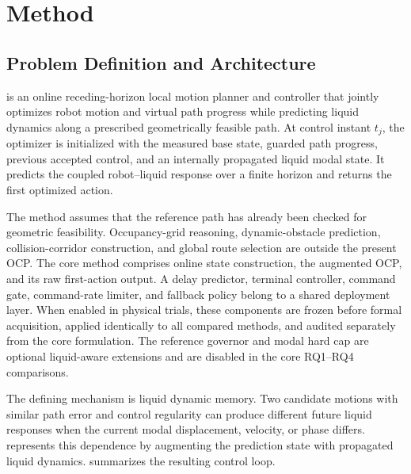 \section{\SMPCC{} Method}
\label{sec:method}

\subsection{Problem Definition and Architecture}

\SMPCC{} is an online receding-horizon local motion planner and controller that jointly optimizes robot motion and virtual path progress while predicting liquid dynamics along a prescribed geometrically feasible path. At control instant $t_j$, the optimizer is initialized with the measured base state, guarded path progress, previous accepted control, and an internally propagated liquid modal state. It predicts the coupled robot--liquid response over a finite horizon and returns the first optimized action.

The method assumes that the reference path has already been checked for geometric feasibility. Occupancy-grid reasoning, dynamic-obstacle prediction, collision-corridor construction, and global route selection are outside the present OCP. The core method comprises online state construction, the augmented OCP, and its raw first-action output. A delay predictor, terminal controller, command gate, command-rate limiter, and fallback policy belong to a shared deployment layer. When enabled in physical trials, these components are frozen before formal acquisition, applied identically to all compared methods, and audited separately from the core formulation. The reference governor and modal hard cap are optional liquid-aware extensions and are disabled in the core RQ1--RQ4 comparisons.

The defining mechanism is liquid dynamic memory. Two candidate motions with similar path error and control regularity can produce different future liquid responses when the current modal displacement, velocity, or phase differs. \SMPCC{} represents this dependence by augmenting the \MPCC{} prediction state with propagated liquid dynamics.  summarizes the resulting control loop.

